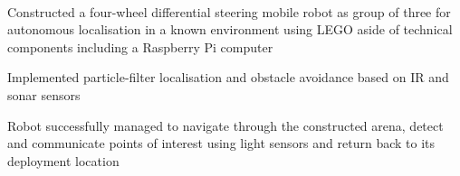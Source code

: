 \documentclass[]{lukas-cv-openfont}
\begin{document}
\noindent
{}
\\
\begin{tightitemize}{1.7em}
    \item Constructed a four-wheel differential steering mobile robot as group of three for autonomous localisation in a 
    known environment using LEGO aside of technical components including a Raspberry Pi computer
    \item Implemented particle-filter localisation and obstacle avoidance based on IR and sonar sensors
    \item Robot successfully managed to navigate through the constructed arena, detect and communicate points of
    interest using light sensors and return back to its deployment location
\end{tightitemize}
\largesectionsep



\end{document}
